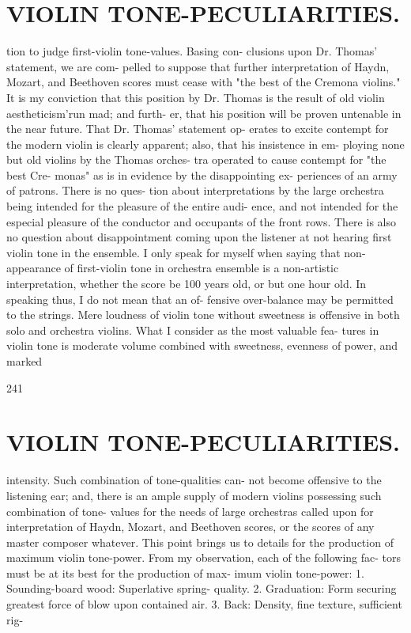 \documentclass{article}
\begin{document}
\section*{VIOLIN TONE-PECULIARITIES.}
tion to judge first-violin tone-values. Basing con- clusions upon Dr. Thomas' statement, we are com- pelled to suppose that further interpretation of Haydn, Mozart, and Beethoven scores must cease with "the best of the Cremona violins." It is my conviction that this position by Dr. Thomas is the result of old violin aestheticism'run mad; and furth- er, that his position will be proven untenable in the near future. That Dr. Thomas' statement op- erates to excite contempt for the modern violin is clearly apparent; also, that his insistence in em- ploying none but old violins by the Thomas orches- tra operated to cause contempt for "the best Cre- monas" as is in evidence by the disappointing ex- periences of an army of patrons. There is no ques- tion about interpretations by the large orchestra being intended for the pleasure of the entire audi- ence, and not intended for the especial pleasure of the conductor and occupants of the front rows. There is also no question about disappointment coming upon the listener at not hearing first violin tone in the ensemble. I only speak for myself when saying that non-appearance of first-violin tone in orchestra ensemble is a non-artistic interpretation, whether the score be 100 years old, or but one hour old. In speaking thus, I do not mean that an of- fensive over-balance may be permitted to the strings. Mere loudness of violin tone without sweetness is offensive in both solo and orchestra violins. What I consider as the most valuable fea- tures in violin tone is moderate volume combined with sweetness, evenness of power, and marked

241

\section*{VIOLIN TONE-PECULIARITIES.}
intensity. Such combination of tone-qualities can- not become offensive to the listening ear; and, there is an ample supply of modern violins possessing such combination of tone- values for the needs of large orchestras called upon for interpretation of Haydn, Mozart, and Beethoven scores, or the scores of any master composer whatever. This point brings us to details for the production of maximum violin tone-power. From my observation, each of the following fac- tors must be at its best for the production of max- imum violin tone-power: 1. Sounding-board wood: Superlative spring- quality. 2. Graduation: Form securing greatest force of blow upon contained air. 3. Back: Density, fine texture, sufficient rig-
\end{document}
